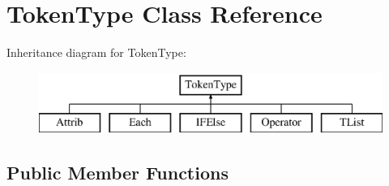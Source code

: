 \hypertarget{class_token_type}{\section{Token\-Type Class Reference}
\label{class_token_type}
}
Inheritance diagram for Token\-Type\-:\begin{figure}[H]
\begin{center}
\leavevmode
\includegraphics[height=2.000000cm]{class_token_type}
\end{center}
\end{figure}
\subsection*{Public Member Functions}
